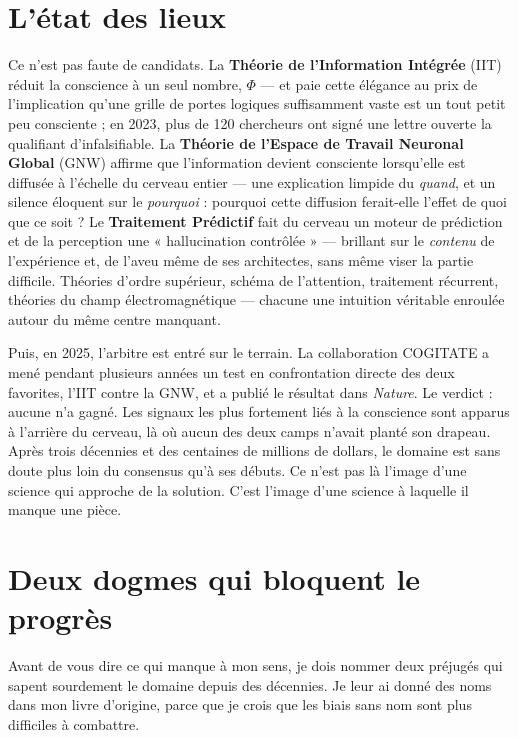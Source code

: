 \documentclass[11pt, twoside, openright]{book}
\begin{document}
\section*{L'état des lieux}

Ce n'est pas faute de candidats. La \textbf{Théorie de l'Information Intégrée} (IIT) réduit la conscience à un seul nombre, $\Phi$ --- et paie cette élégance au prix de l'implication qu'une grille de portes logiques suffisamment vaste est un tout petit peu consciente ; en 2023, plus de 120 chercheurs ont signé une lettre ouverte la qualifiant d'infalsifiable. La \textbf{Théorie de l'Espace de Travail Neuronal Global} (GNW) affirme que l'information devient consciente lorsqu'elle est diffusée à l'échelle du cerveau entier --- une explication limpide du \textit{quand}, et un silence éloquent sur le \textit{pourquoi} : pourquoi cette diffusion ferait-elle l'effet de quoi que ce soit ? Le \textbf{Traitement Prédictif} fait du cerveau un moteur de prédiction et de la perception une « hallucination contrôlée » --- brillant sur le \textit{contenu} de l'expérience et, de l'aveu même de ses architectes, sans même viser la partie difficile. Théories d'ordre supérieur, schéma de l'attention, traitement récurrent, théories du champ électromagnétique --- chacune une intuition véritable enroulée autour du même centre manquant.

Puis, en 2025, l'arbitre est entré sur le terrain. La collaboration COGITATE a mené pendant plusieurs années un test en confrontation directe des deux favorites, l'IIT contre la GNW, et a publié le résultat dans \textit{Nature}. Le verdict : aucune n'a gagné. Les signaux les plus fortement liés à la conscience sont apparus à l'arrière du cerveau, là où aucun des deux camps n'avait planté son drapeau. Après trois décennies et des centaines de millions de dollars, le domaine est sans doute plus loin du consensus qu'à ses débuts. Ce n'est pas là l'image d'une science qui approche de la solution. C'est l'image d'une science à laquelle il manque une pièce.

\section*{Deux dogmes qui bloquent le progrès}

Avant de vous dire ce qui manque à mon sens, je dois nommer deux préjugés qui sapent sourdement le domaine depuis des décennies. Je leur ai donné des noms dans mon livre d'origine, parce que je crois que les biais sans nom sont plus difficiles à combattre.
\end{document}
